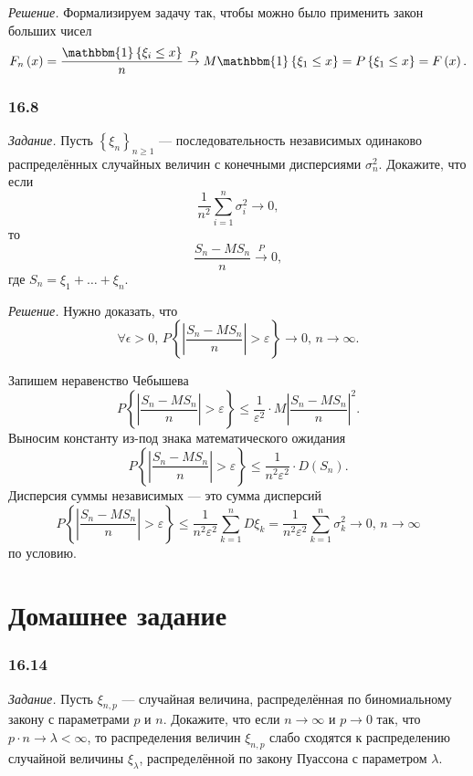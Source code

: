 \textit{Решение.} Формализируем задачу так, чтобы можно было применить закон больших чисел
$$F_n \left( x \right) =
  \frac{ \mathbbm{1} \left\{ \xi_i \leq x \right\}}{n} \overset{P}{ \rightarrow }
  M \mathbbm{1} \left\{ \xi_1 \leq x \right\} =
  P \left\{ \xi_1 \leq x \right\} =
  F \left( x \right).$$

\subsubsection*{16.8}

\textit{Задание.}
Пусть $ \left\{ \xi_n \right\}_{n \geq 1}$ ---
последовательность независимых одинаково распределённых случайных величин с конечными дисперсиями
$ \sigma_n^2$.
Докажите, что если
$$ \frac{1}{n^2} \sum \limits_{i = 1}^n \sigma_i^2 \to 0,$$
то
$$ \frac{ S_n - MS_n}{n} \overset{P}{ \rightarrow } 0,$$
где $S_n = \xi_1 + \dotsc + \xi_n$.

\textit{Решение.} Нужно доказать, что
$$ \forall \epsilon > 0, \,
  P \left\{ \left| \frac{S_n - MS_n}{n} \right| > \varepsilon \right\} \to 0, \,
  n \to \infty.$$

Запишем неравенство Чебышева
$$P \left\{ \left| \frac{S_n - MS_n}{n} \right| > \varepsilon \right\} \leq
  \frac{1}{ \varepsilon^2} \cdot M \left| \frac{S_n - MS_n}{n} \right|^2.$$
Выносим константу из-под знака математического ожидания
$$P \left\{ \left| \frac{S_n - MS_n}{n} \right| > \varepsilon \right\} \leq
  \frac{1}{n^2 \varepsilon^2} \cdot D \left( S_n \right).$$
Дисперсия суммы независимых --- это сумма дисперсий
$$P \left\{ \left| \frac{S_n - MS_n}{n} \right| > \varepsilon \right\} \leq
  \frac{1}{n^2 \varepsilon^2} \sum \limits_{k = 1}^n D \xi_k =
  \frac{1}{n^2 \varepsilon^2} \sum \limits_{k = 1}^n \sigma_k^2 \to
  0, \,
  n \to \infty $$
  по условию.

\section*{Домашнее задание}

\subsubsection*{16.14}

\textit{Задание.} Пусть $ \xi_{n, p}$ --- случайная величина,
распределённая по биномиальному закону с параметрами $p$ и $n$.
Докажите, что если $n \rightarrow \infty $ и $p \rightarrow 0$ так, что
$p \cdot n \rightarrow \lambda < \infty $,
то распределения величин $ \xi_{n, p}$ слабо сходятся к распределению случайной величины
$ \xi_{ \lambda }$, распределённой по закону Пуассона с параметром $ \lambda $.

